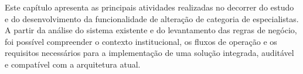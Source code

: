 Este capítulo apresenta as principais atividades realizadas no decorrer do estudo e do 
desenvolvimento da funcionalidade de alteração de categoria de especialistas. A partir 
da análise do sistema existente e do levantamento das regras de negócio, foi possível 
compreender o contexto institucional, os fluxos de operação e os requisitos necessários 
para a implementação de uma solução integrada, auditável e compatível com a arquitetura atual.
